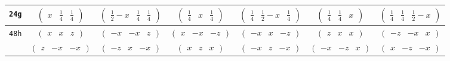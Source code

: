\documentclass[fleqn,9pt,landscape]{jsarticle}
\begin{document}
\begin{center}
\begin{longtable}{ccccccc}
{\tt 24g} & $ \begin{pmatrix} x & \frac{1}{4} & \frac{1}{4} \end{pmatrix} $ & $ \begin{pmatrix} \frac{1}{2} - x & \frac{1}{4} & \frac{1}{4} \end{pmatrix} $ & $ \begin{pmatrix} \frac{1}{4} & x & \frac{1}{4} \end{pmatrix} $ & $ \begin{pmatrix} \frac{1}{4} & \frac{1}{2} - x & \frac{1}{4} \end{pmatrix} $ & $ \begin{pmatrix} \frac{1}{4} & \frac{1}{4} & x \end{pmatrix} $ & $ \begin{pmatrix} \frac{1}{4} & \frac{1}{4} & \frac{1}{2} - x \end{pmatrix} $ \\ \hline
{\tt 48h} & $ \begin{pmatrix} x & x & z \end{pmatrix} $ & $ \begin{pmatrix} - x & - x & z \end{pmatrix} $ & $ \begin{pmatrix} x & - x & - z \end{pmatrix} $ & $ \begin{pmatrix} - x & x & - z \end{pmatrix} $ & $ \begin{pmatrix} z & x & x \end{pmatrix} $ & $ \begin{pmatrix} - z & - x & x \end{pmatrix} $ \\
& $ \begin{pmatrix} z & - x & - x \end{pmatrix} $ & $ \begin{pmatrix} - z & x & - x \end{pmatrix} $ & $ \begin{pmatrix} x & z & x \end{pmatrix} $ & $ \begin{pmatrix} - x & z & - x \end{pmatrix} $ & $ \begin{pmatrix} - x & - z & x \end{pmatrix} $ & $ \begin{pmatrix} x & - z & - x \end{pmatrix} $ \\ \hline

\end{longtable}
\end{center}
\end{document}
